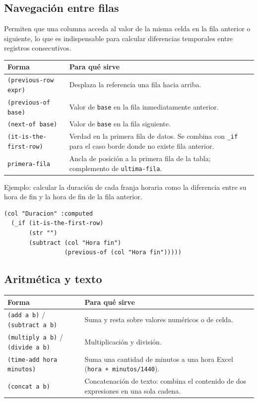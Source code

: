 \documentclass[12pt,a4paper]{report}
\begin{document}
\subsection*{Navegación entre filas}

Permiten que una columna acceda al valor de la misma celda en la fila
anterior o siguiente, lo que es indispensable para calcular diferencias
temporales entre registros consecutivos.

\begin{center}
\begin{tabular}{lp{8cm}}
\toprule
\textbf{Forma} & \textbf{Para qué sirve} \\
\midrule
\texttt{(previous-row expr)} & Desplaza la referencia una fila hacia arriba. \\
\texttt{(previous-of base)} & Valor de \texttt{base} en la fila inmediatamente
  anterior. \\
\texttt{(next-of base)} & Valor de \texttt{base} en la fila siguiente. \\
\texttt{(it-is-the-first-row)} & Verdad en la primera fila de datos.  Se
  combina con \texttt{\_if} para el caso borde donde no existe fila anterior. \\
\texttt{primera-fila} & Ancla de posición a la primera fila de la tabla;
  complemento de \texttt{ultima-fila}. \\
\bottomrule
\end{tabular}
\end{center}

Ejemplo: calcular la duración de cada franja horaria como la diferencia
entre su hora de fin y la hora de fin de la fila anterior.

\begin{lstlisting}
(col "Duracion" :computed
  (_if (it-is-the-first-row)
       (str "")
       (subtract (col "Hora fin")
                 (previous-of (col "Hora fin")))))
\end{lstlisting}

\subsection*{Aritmética y texto}

\begin{center}
\begin{tabular}{lp{8cm}}
\toprule
\textbf{Forma} & \textbf{Para qué sirve} \\
\midrule
\texttt{(add a b)} / \texttt{(subtract a b)} & Suma y resta sobre valores
  numéricos o de celda. \\
\texttt{(multiply a b)} / \texttt{(divide a b)} & Multiplicación y división. \\
\texttt{(time-add hora minutos)} & Suma una cantidad de minutos a una hora
  Excel (\texttt{hora + minutos/1440}). \\
\texttt{(concat a b)} & Concatenación de texto: combina el contenido de dos
  expresiones en una sola cadena. \\
\bottomrule
\end{tabular}
\end{center}
\end{document}
